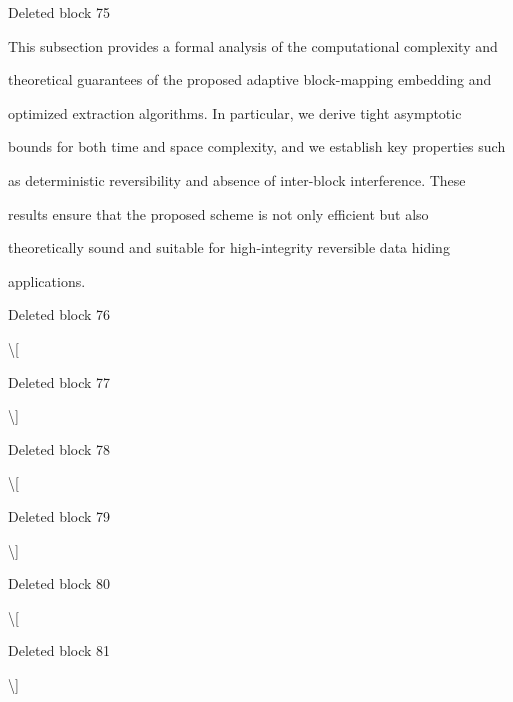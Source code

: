 \documentclass[a4paper,fleqn]{cas-dc}
\newenvironment{RevisionDeletion}{%
  \par\begingroup\color{revisionred}\footnotesize\ttfamily
  \setlength{\parindent}{0pt}\setlength{\parskip}{1pt}\obeyspaces
}{\par\endgroup}
\begin{document}
\begin{RevisionDeletion}
Deleted block 75\par
This subsection provides a formal analysis of the computational complexity and\par
theoretical guarantees of the proposed adaptive block-mapping embedding and\par
optimized extraction algorithms. In particular, we derive tight asymptotic\par
bounds for both time and space complexity, and we establish key properties such\par
as deterministic reversibility and absence of inter-block interference. These\par
results ensure that the proposed scheme is not only efficient but also\par
theoretically sound and suitable for high-integrity reversible data hiding\par
applications.\par
\end{RevisionDeletion}

\begin{RevisionDeletion}
Deleted block 76\par
\textbackslash{}[\par
\end{RevisionDeletion}

\begin{RevisionDeletion}
Deleted block 77\par
\textbackslash{}]\par
\end{RevisionDeletion}

\begin{RevisionDeletion}
Deleted block 78\par
\textbackslash{}[\par
\end{RevisionDeletion}

\begin{RevisionDeletion}
Deleted block 79\par
\textbackslash{}]\par
\end{RevisionDeletion}

\begin{RevisionDeletion}
Deleted block 80\par
\textbackslash{}[\par
\end{RevisionDeletion}

\begin{RevisionDeletion}
Deleted block 81\par
\textbackslash{}]\par
\end{RevisionDeletion}
\end{document}
